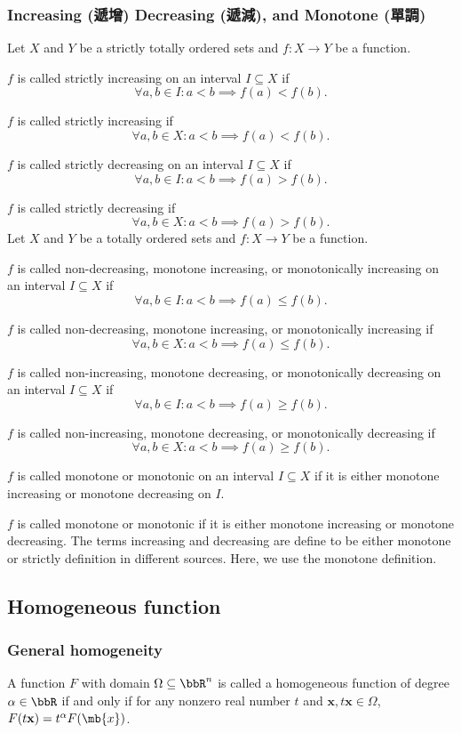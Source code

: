\subsubsection{Increasing (遞增) Decreasing (遞減), and Monotone (單調)}
Let $X$ and $Y$ be a strictly totally ordered sets and $f\colon X\to Y$ be a function.
\bit
\item $f$ is called strictly increasing on an interval $I\subseteq X$ if
\[\forall a,b\in I\colon a<b\implies f(a)<f(b).\]
\item $f$ is called strictly increasing if
\[\forall a,b\in X\colon a<b\implies f(a)<f(b).\]
\item $f$ is called strictly decreasing on an interval $I\subseteq X$ if
\[\forall a,b\in I\colon a<b\implies f(a)>f(b).\]
\item $f$ is called strictly decreasing if
\[\forall a,b\in X\colon a<b\implies f(a)>f(b).\]
\eit
Let $X$ and $Y$ be a totally ordered sets and $f\colon X\to Y$ be a function.
\bit
\item $f$ is called non-decreasing, monotone increasing, or monotonically increasing on an interval $I\subseteq X$ if
\[\forall a,b\in I\colon a<b\implies f(a)\leq f(b).\]
\item $f$ is called non-decreasing, monotone increasing, or monotonically increasing if
\[\forall a,b\in X\colon a<b\implies f(a)\leq f(b).\]
\item $f$ is called non-increasing, monotone decreasing, or monotonically decreasing on an interval $I\subseteq X$ if
\[\forall a,b\in I\colon a<b\implies f(a)\geq f(b).\]
\item $f$ is called non-increasing, monotone decreasing, or monotonically decreasing if
\[\forall a,b\in X\colon a<b\implies f(a)\geq f(b).\]
\item $f$ is called monotone or monotonic on an interval $I\subseteq X$ if it is either monotone increasing or monotone decreasing on $I$.
\item $f$ is called monotone or monotonic if it is either monotone increasing or monotone decreasing.
\eit
The terms increasing and decreasing are define to be either monotone or strictly definition in different sources. Here, we use the monotone definition.
\subsection{Homogeneous function}
\subsubsection{General homogeneity}
A function $F$ with domain $\Omega\subseteq\bbR^n$ is called a homogeneous function of degree $\alpha\in\bbR$ if and only if for any nonzero real number $t$ and $\mathbf{x},t\mathbf{x}\in\Omega$, $F(t\mathbf{x})=t^{\alpha}F(\mb{x})$.

